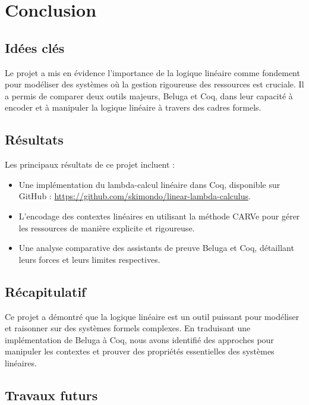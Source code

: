 %
\chapter{Conclusion}
\label{sec::chapitre6}

\section{Idées clés}

Le projet a mis en évidence l'importance de la logique linéaire comme fondement pour modéliser des systèmes où la gestion rigoureuse des ressources est cruciale. Il a permis de comparer deux outils majeurs, Beluga et Coq, dans leur capacité à encoder et à manipuler la logique linéaire à travers des cadres formels.

\section{Résultats}

Les principaux résultats de ce projet incluent :
\begin{itemize}
    \item Une implémentation du lambda-calcul linéaire dans Coq, disponible sur GitHub : \url{https://github.com/skimondo/linear-lambda-calculus}.
    \item L'encodage des contextes linéaires en utilisant la méthode CARVe pour gérer les ressources de manière explicite et rigoureuse.
    \item Une analyse comparative des assistants de preuve Beluga et Coq, détaillant leurs forces et leurs limites respectives.
\end{itemize}

\section{Récapitulatif}

Ce projet a démontré que la logique linéaire est un outil puissant pour modéliser et raisonner sur des systèmes formels complexes. En traduisant une implémentation de Beluga à Coq, nous avons identifié des approches pour manipuler les contextes et prouver des propriétés essentielles des systèmes linéaires.

\section{Travaux futurs}

